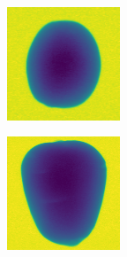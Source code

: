 \documentclass[11pt]{article}
\begin{document}
\begin{figure}[!h]
\begin{subfigure}[b]{0.22\textwidth}
         \caption{}
         \label{fig:perfect_3}
     \end{subfigure}
     \\
    \begin{subfigure}[b]{0.22\textwidth}
         \centering
         \includegraphics[width=\textwidth]{figurer/potato_dataset/perfect/perfect_4.jpg}
         \caption{}
         \label{fig:perfect_4}
     \end{subfigure}
     \hfill
     \begin{subfigure}[b]{0.22\textwidth}
         \centering
         \includegraphics[width=\textwidth]{figurer/potato_dataset/perfect/perfect_5.jpg}

\end{subfigure}
\end{figure}
\end{document}
